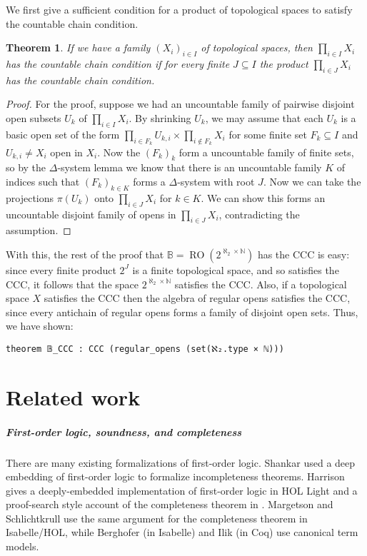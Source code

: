 \documentclass[a4paper,USenglish,cleveref, autoref]{lipics-v2019}
\newcommand{\B}{\mathbb{B}}
\theoremstyle{theorem}
\newtheorem{thm}[theorem]{Theorem}
\theoremstyle{definition}
\begin{document}
We first give a sufficient condition for a product of topological spaces to satisfy the countable chain condition.
\begin{thm}
If we have a family $(X_i)_{i\in I}$ of topological spaces, then $\prod_{i\in I} X_i$ has the countable chain condition if for every finite $J\subseteq I$ the product $\prod_{i\in J} X_i$ has the countable chain condition.
\end{thm}
\begin{proof}
For the proof, suppose we had an uncountable family of pairwise disjoint open subsets $U_k$ of $\prod_{i\in I} X_i$. By shrinking $U_k$, we may assume that each $U_k$ is a basic open set of the form $\prod_{i\in F_k} U_{k,i} \times \prod_{i \not\in F_k} X_i$ for some finite set $F_k\subseteq I$ and $U_{k,i}\neq X_i$ open in $X_i$. Now the $(F_k)_k$ form a uncountable family of finite sets, so by the $\Delta$-system lemma we know that there is an uncountable family $K$ of indices such that $(F_k)_{k\in K}$ forms a $\Delta$-system with root $J$. Now we can take the projections $\pi(U_k)$ onto $\prod_{i\in J}X_i$ for $k\in K$. We can show this forms an uncountable disjoint family of opens in $\prod_{i\in J}X_i$, contradicting the assumption.
\end{proof}

With this, the rest of the proof that $\B=\operatorname{RO}(2^{\aleph_2 \times \mathbb{N}})$ has the CCC is easy: since every finite product $2^J$ is a finite topological space, and so satisfies the CCC, it follows that the space $2^{\aleph_2 \times \mathbb{N}}$ satisfies the CCC. Also, if a topological space $X$ satisfies the CCC then the algebra of regular opens satisfies the CCC, since every antichain of regular opens forms a family of disjoint open sets. Thus, we have shown:
\begin{lstlisting}
theorem 𝔹_CCC : CCC (regular_opens (set(ℵ₂.type × ℕ)))
\end{lstlisting}

\section{Related work}
\subparagraph*{First-order logic, soundness, and completeness} There are many existing formalizations of first-order logic. Shankar \cite{shankar1997metamathematics} used a deep embedding of first-order logic to formalize incompleteness theorems. Harrison gives a deeply-embedded implementation of first-order logic in HOL Light \cite{harrison1998formalizing} and a proof-search style account of the completeness theorem in \cite{harrison2009handbook}. Margetson \cite{Ridge2005AMV} and Schlichtkrull \cite{schlichtkrull2018formalization} use the same argument for the completeness theorem in Isabelle/HOL, while Berghofer \cite{FOL-Fitting-AFP} (in Isabelle) and Ilik \cite {ilik2010constructive} (in Coq) use canonical term models.
\end{document}
